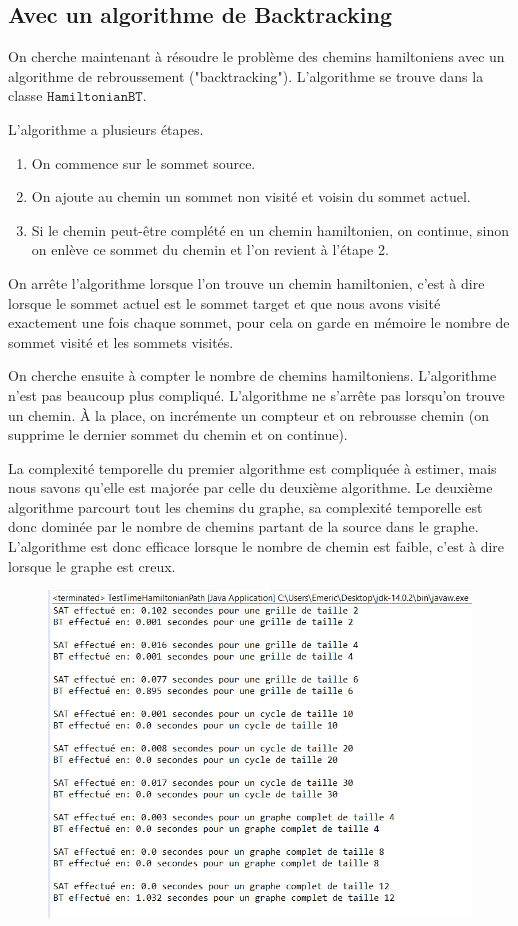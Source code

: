 \documentclass[11pt, a4paper]{article}
\begin{document}
\subsection{Avec un algorithme de Backtracking}

On cherche maintenant à résoudre le problème des chemins hamiltoniens avec un algorithme de rebroussement ("backtracking"). L'algorithme se trouve dans la classe $\mathtt{HamiltonianBT}$. 

L'algorithme a plusieurs étapes. 

\begin{enumerate}
    \item On commence sur le sommet source.
    \item On ajoute  au chemin un sommet non visité et voisin du sommet actuel.
    \item Si le chemin peut-être complété en un chemin hamiltonien, on continue, sinon on enlève ce sommet du chemin et l'on revient à l'étape 2.
\end{enumerate}  

On arrête l'algorithme lorsque l'on trouve un chemin hamiltonien, c'est à dire lorsque le sommet actuel est le sommet target et que nous avons visité exactement une fois chaque sommet, pour cela on garde en mémoire le nombre de sommet visité et les sommets visités.

On cherche ensuite à compter le nombre de chemins hamiltoniens. L'algorithme n'est pas beaucoup plus compliqué. L'algorithme ne s'arrête pas lorsqu'on trouve un chemin. À la place, on incrémente un compteur et on rebrousse chemin (on supprime le dernier sommet du chemin et on continue). 

La complexité temporelle du premier algorithme est compliquée à estimer, mais nous savons qu'elle est majorée par celle du deuxième algorithme. Le deuxième algorithme parcourt tout les chemins du graphe, sa complexité temporelle est donc dominée par le nombre de chemins partant de la source dans le graphe. L'algorithme est donc efficace lorsque le nombre de chemin est faible, c'est à dire lorsque le graphe est creux.

\begin{figure}[h]
	\centering
	\includegraphics[scale=0.8]{RunTimeHamiltonianPath.png}
\end{figure}
\end{document}
